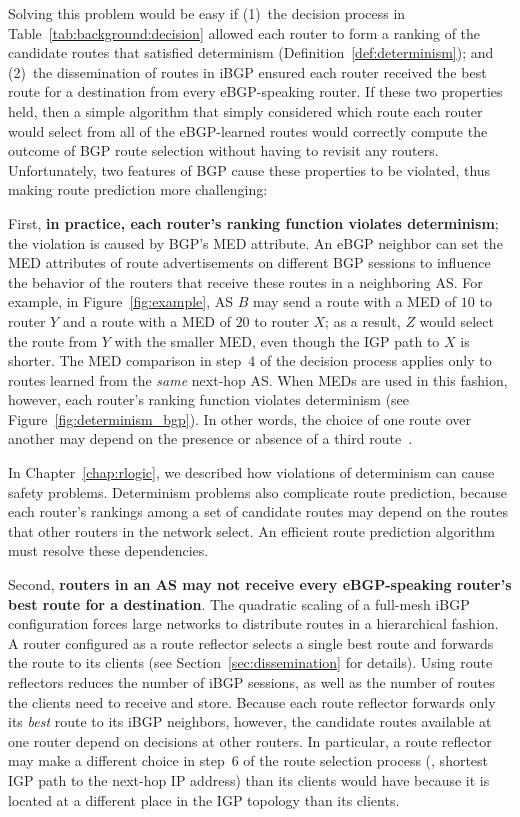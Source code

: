 \noindent
Solving this problem would be easy if (1)~the decision process in
Table~\ref{tab:background:decision} allowed each router to form a
ranking of the candidate routes that satisfied determinism
(Definition~\ref{def:determinism}); and (2)~the dissemination of routes
in iBGP ensured each router received the best route for a destination
from every eBGP-speaking router.  If these two properties held, then a
simple algorithm that simply considered which route each router would
select from all of the eBGP-learned routes would correctly compute the
outcome of BGP route selection without having to revisit any routers.
Unfortunately, two features of BGP cause these properties to be
violated, thus making route prediction more challenging:

First, {\bf in practice, each router's ranking function violates
determinism}; the violation is caused by BGP's MED attribute.  An eBGP
neighbor can set the MED attributes of route advertisements on different
BGP sessions to influence the behavior of the routers that receive these
routes in a neighboring AS.  For example, in Figure~\ref{fig:example},
AS $B$ may send a route with a MED of $10$ to router $Y$ and a route
with a MED of
$20$ to router $X$;
as a result, $Z$ would select the route from $Y$ with the smaller MED,
even though the IGP path to $X$ is shorter.  The MED comparison in
step~$4$ of the decision process applies only to routes learned from the
{\em same} next-hop AS.  When MEDs are used in this fashion, however, each
router's ranking function violates determinism (see
Figure~\ref{fig:determinism_bgp}). In other words, the choice of one route over
another may depend on the presence or absence of a third
route~\cite{www-cisco-determed}.

In Chapter~\ref{chap:rlogic}, we described how violations of determinism
can cause safety problems.  Determinism problems also complicate route
prediction, because each router's rankings among a set of candidate routes
may depend on the routes that other routers in the network select.  An
efficient route prediction algorithm must resolve these dependencies. 

Second, {\bf routers in an AS may not receive every eBGP-speaking
router's best route for a destination}. The quadratic scaling of a
full-mesh iBGP configuration forces large networks to distribute routes
in a hierarchical fashion.  A router configured as a route reflector
selects a single best route and forwards the route to its clients (see
Section~\ref{sec:dissemination} for details).
Using route reflectors reduces the number of iBGP sessions, as well as
the number of routes the clients need to receive and store.  Because
each route reflector forwards only its {\em best} route to its iBGP
neighbors, however, the candidate routes available at one router depend
on decisions at other routers.  In particular, a route reflector may
make a different choice in step~6 of the route selection process (\ie,
shortest IGP path to the next-hop IP address) than its clients would
have because it is 
located at a different place in the IGP topology than its clients.

